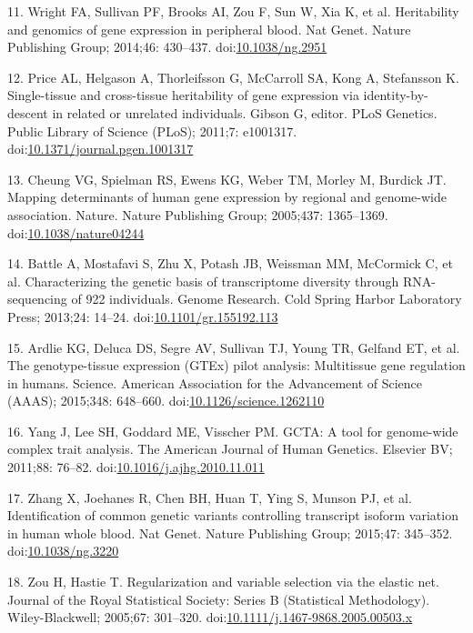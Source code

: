 \documentclass[]{article}
\begin{document}
11. Wright FA, Sullivan PF, Brooks AI, Zou F, Sun W, Xia K, et al.
Heritability and genomics of gene expression in peripheral blood. Nat
Genet. Nature Publishing Group; 2014;46: 430--437.
doi:\href{http://dx.doi.org/10.1038/ng.2951}{10.1038/ng.2951}

12. Price AL, Helgason A, Thorleifsson G, McCarroll SA, Kong A,
Stefansson K. Single-tissue and cross-tissue heritability of gene
expression via identity-by-descent in related or unrelated individuals.
Gibson G, editor. PLoS Genetics. Public Library of Science (PLoS);
2011;7: e1001317.
doi:\href{http://dx.doi.org/10.1371/journal.pgen.1001317}{10.1371/journal.pgen.1001317}

13. Cheung VG, Spielman RS, Ewens KG, Weber TM, Morley M, Burdick JT.
Mapping determinants of human gene expression by regional and
genome-wide association. Nature. Nature Publishing Group; 2005;437:
1365--1369.
doi:\href{http://dx.doi.org/10.1038/nature04244}{10.1038/nature04244}

14. Battle A, Mostafavi S, Zhu X, Potash JB, Weissman MM, McCormick C,
et al. Characterizing the genetic basis of transcriptome diversity
through RNA-sequencing of 922 individuals. Genome Research. Cold Spring
Harbor Laboratory Press; 2013;24: 14--24.
doi:\href{http://dx.doi.org/10.1101/gr.155192.113}{10.1101/gr.155192.113}

15. Ardlie KG, Deluca DS, Segre AV, Sullivan TJ, Young TR, Gelfand ET,
et al. The genotype-tissue expression (GTEx) pilot analysis: Multitissue
gene regulation in humans. Science. American Association for the
Advancement of Science (AAAS); 2015;348: 648--660.
doi:\href{http://dx.doi.org/10.1126/science.1262110}{10.1126/science.1262110}

16. Yang J, Lee SH, Goddard ME, Visscher PM. GCTA: A tool for
genome-wide complex trait analysis. The American Journal of Human
Genetics. Elsevier BV; 2011;88: 76--82.
doi:\href{http://dx.doi.org/10.1016/j.ajhg.2010.11.011}{10.1016/j.ajhg.2010.11.011}

17. Zhang X, Joehanes R, Chen BH, Huan T, Ying S, Munson PJ, et al.
Identification of common genetic variants controlling transcript isoform
variation in human whole blood. Nat Genet. Nature Publishing Group;
2015;47: 345--352.
doi:\href{http://dx.doi.org/10.1038/ng.3220}{10.1038/ng.3220}

18. Zou H, Hastie T. Regularization and variable selection via the
elastic net. Journal of the Royal Statistical Society: Series B
(Statistical Methodology). Wiley-Blackwell; 2005;67: 301--320.
doi:\href{http://dx.doi.org/10.1111/j.1467-9868.2005.00503.x}{10.1111/j.1467-9868.2005.00503.x}
\end{document}
